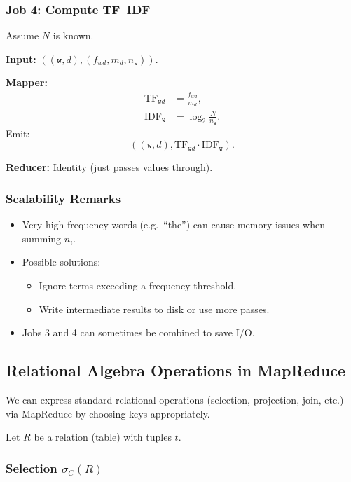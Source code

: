 \documentclass[11pt]{article}
\begin{document}
\subsubsection*{Job 4: Compute TF--IDF}

Assume $N$ is known.

\textbf{Input:} $((\texttt{w}, d), (f_{wd}, m_d, n_{\texttt{w}}))$.

\textbf{Mapper:}
\begin{align*}
    \text{TF}_{\texttt{w}d} &= \frac{f_{wd}}{m_d},\\
    \text{IDF}_{\texttt{w}} &= \log_2\frac{N}{n_{\texttt{w}}}.
\end{align*}
Emit:
\[
    ((\texttt{w}, d), \text{TF}_{\texttt{w}d} \cdot \text{IDF}_{\texttt{w}}).
\]

\textbf{Reducer:} Identity (just passes values through).

\subsubsection*{Scalability Remarks}

\begin{itemize}
    \item Very high-frequency words (e.g.\ ``the'') can cause memory issues when summing $n_i$.
    \item Possible solutions:
    \begin{itemize}
        \item Ignore terms exceeding a frequency threshold.
        \item Write intermediate results to disk or use more passes.
    \end{itemize}
    \item Jobs 3 and 4 can sometimes be combined to save I/O.
\end{itemize}

\subsection{Relational Algebra Operations in MapReduce}

We can express standard relational operations (selection, projection, join, etc.) via MapReduce by choosing keys appropriately.

Let $R$ be a relation (table) with tuples $t$.

\subsubsection*{Selection $\sigma_C(R)$}
\end{document}
